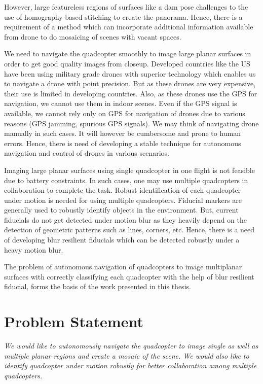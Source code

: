However, large featureless regions of surfaces like a dam pose challenges to
the use of homography based stitching to create the panorama. Hence, there is a
requirement of a method which can incorporate additional information available from drone to do
mosaicing of scenes with vacant spaces. 

We need to navigate the quadcopter smoothly to image large planar surfaces in
order to get good quality images from closeup. Developed countries like the US
have been using military grade drones with superior technology which enables us to
navigate a drone with point precision. But as these drones are very expensive,
their use is limited in developing countries. Also, as these drones use the GPS
for navigation, we cannot use them in indoor scenes. Even if the GPS signal is
available, we cannot rely only on GPS for navigation of drones due to various
reasons (GPS jamming, spurious GPS signals). We may think of navigating drone
manually in such cases. It will however be cumbersome and prone to human errors.
Hence, there is need of developing a stable technique for autonomous navigation
and control of drones in various scenarios.

Imaging large planar surfaces using single quadcopter in one flight is not
feasible due to battery constraints. In such cases, one may use multiple
quadcopters in collaboration to complete the task. Robust identification of
each quadcopter under motion is needed for using multiple quadcopters. Fiducial
markers are generally used to robustly identify objects in the environment. But,
current fiducials do not get detected under motion blur as they heavily depend on the
detection of geometric patterns such as lines, corners, etc. Hence, there is a
need of developing blur resilient fiducials which can be detected robustly under
a heavy motion blur.

The problem of autonomous navigation of quadcopters to image multiplanar
surfaces with correctly classifying each quadcopter with the help of blur
resilient fiducial, forms the basis of the work presented in this thesis.\\

\section{Problem Statement}
\textit{We would like to autonomously navigate the quadcopter to image
single as well as multiple planar regions and create a mosaic of the 
scene. We would also like to identify quadcopter under motion robustly for
better collaboration among multiple quadcopters.} 

